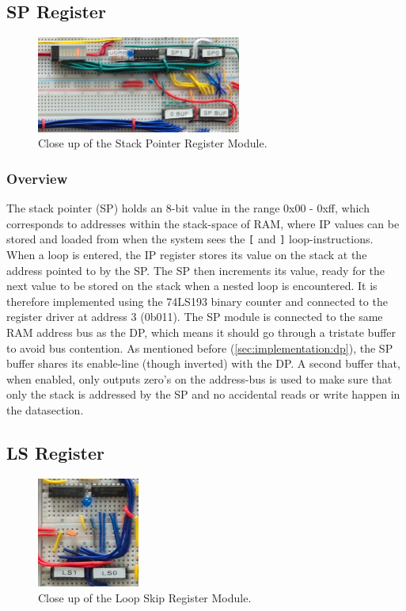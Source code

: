
\newpage\subsection{SP Register}
\begin{figure}[H]
  \centering
  \includegraphics[width=0.6\textwidth]{img/spregistercloseup}
  \caption{Close up of the Stack Pointer Register Module.}
  \label{fig:spregcloseup}
\end{figure}

\subsubsection{Overview}
The stack pointer (SP) holds an 8-bit value in the range 0x00 - 0xff, which corresponds to addresses within the stack-space of RAM, where IP values can be stored and loaded from when the system sees the \texttt{[} and \texttt{]} loop-instructions. When a loop is entered, the IP register stores its value on the stack at the address pointed to by the SP. The SP then increments its value, ready for the next value to be stored on the stack when a nested loop is encountered. It is therefore implemented using the 74LS193 binary counter and connected to the register driver at address 3 (0b011). The SP module is connected to the same RAM address bus as the DP, which means it should go through a tristate buffer to avoid bus contention. As mentioned before (\ref{sec:implementation:dp}), the SP buffer shares its enable-line (though inverted) with the DP. A second buffer that, when enabled, only outputs zero's on the address-bus is used to make sure that only the stack is addressed by the SP and no accidental reads or write happen in the datasection. 



\newpage\subsection{LS Register}
\begin{figure}[H]
  \centering
  \includegraphics[width=0.3\textwidth]{img/lsregistercloseup}
  \caption{Close up of the Loop Skip Register Module.}
  \label{fig:spregcloseup}
\end{figure}

